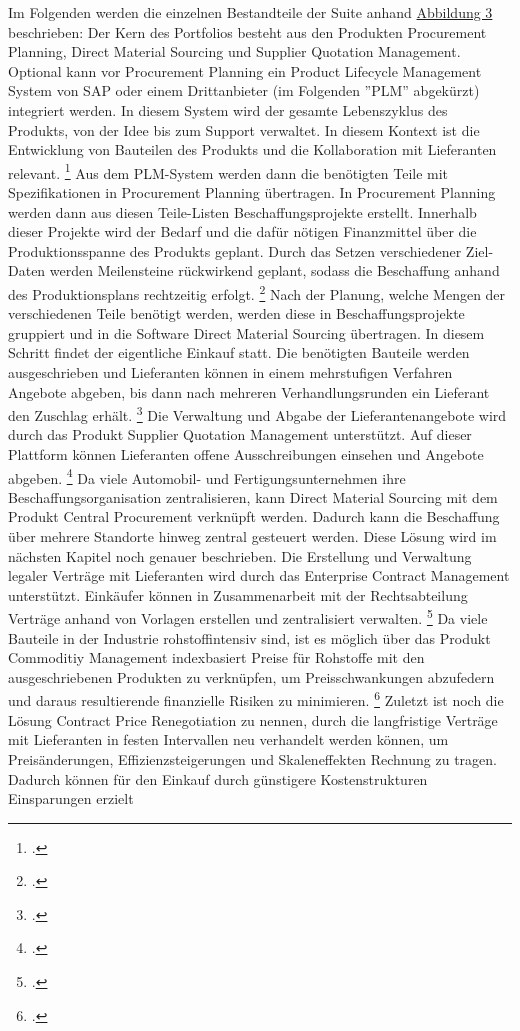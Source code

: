 Im Folgenden werden die einzelnen Bestandteile der Suite anhand \hyperref[fig:Direct_Material_Sourcing_Overview3]{Abbildung 3} beschrieben: Der Kern des Portfolios besteht aus den Produkten Procurement Planning, Direct Material Sourcing und Supplier Quotation Management. Optional kann vor Procurement Planning ein Product Lifecycle Management System von SAP oder einem Drittanbieter (im Folgenden ''PLM'' abgekürzt) integriert werden. In diesem System wird der gesamte Lebenszyklus des Produkts, von der Idee bis zum Support verwaltet. In diesem Kontext ist die Entwicklung von Bauteilen des Produkts und die Kollaboration mit Lieferanten relevant. \footcite[Vgl.][]{theorie_sap_plm_übersicht_2024} Aus dem PLM-System werden dann die benötigten Teile mit Spezifikationen in Procurement Planning übertragen. In Procurement Planning werden dann aus diesen Teile-Listen Beschaffungsprojekte erstellt. Innerhalb dieser Projekte wird der Bedarf und die dafür nötigen Finanzmittel über die Produktionsspanne des Produkts geplant. Durch das Setzen verschiedener Ziel-Daten werden Meilensteine rückwirkend geplant, sodass die Beschaffung anhand des Produktionsplans rechtzeitig erfolgt. \footcite[Vgl.][]{theorie_sap_procurement_planning_overview_2024} Nach der Planung, welche Mengen der verschiedenen Teile benötigt werden, werden diese in Beschaffungsprojekte gruppiert und in die Software Direct Material Sourcing übertragen. In diesem Schritt findet der eigentliche Einkauf statt. Die benötigten Bauteile werden ausgeschrieben und Lieferanten können in einem mehrstufigen Verfahren Angebote abgeben, bis dann nach mehreren Verhandlungsrunden ein Lieferant den Zuschlag erhält. \footcite[Vgl.][]{theorie_sap_webseite_dms_übersicht_2024} Die Verwaltung und Abgabe der Lieferantenangebote wird durch das Produkt Supplier Quotation Management unterstützt. Auf dieser Plattform können Lieferanten offene Ausschreibungen einsehen und Angebote abgeben. \footcite[Vgl.][]{theorie_sap_supplier_quotation_management_help_2024} Da viele Automobil- und Fertigungsunternehmen ihre Beschaffungsorganisation zentralisieren, kann Direct Material Sourcing mit dem Produkt Central Procurement verknüpft werden. Dadurch kann die Beschaffung über mehrere Standorte hinweg zentral gesteuert werden. Diese Lösung wird im nächsten Kapitel noch genauer beschrieben. Die Erstellung und Verwaltung legaler Verträge mit Lieferanten wird durch das Enterprise Contract Management unterstützt. Einkäufer können in Zusammenarbeit mit der Rechtsabteilung Verträge anhand von Vorlagen erstellen und zentralisiert verwalten. \footcite[Vgl.][]{theorie_sap_enterprise_contract_management_2024} Da viele Bauteile in der Industrie rohstoffintensiv sind, ist es möglich über das Produkt Commoditiy Management indexbasiert Preise für Rohstoffe mit den ausgeschriebenen Produkten zu verknüpfen, um Preisschwankungen abzufedern und daraus resultierende finanzielle Risiken zu minimieren. \footcite[Vgl.][]{theorie_sap_commodity_management_2024} Zuletzt ist noch die Lösung Contract Price Renegotiation zu nennen, durch die langfristige Verträge mit Lieferanten in festen Intervallen neu verhandelt werden können, um Preisänderungen, Effizienzsteigerungen und Skaleneffekten Rechnung zu tragen. Dadurch können für den Einkauf durch günstigere Kostenstrukturen Einsparungen erzielt 